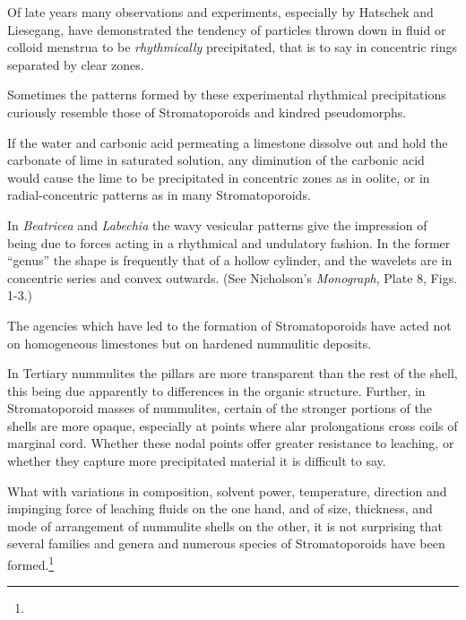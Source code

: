 \documentclass[a4paper, 12pt, oneside]{article}
\begin{document}
Of late years many observations and experiments, especially by Hatschek and Liesegang, have demonstrated the tendency of particles thrown down in fluid or colloid menstrua to be \emph{rhythmically} precipitated, that is to say in concentric rings separated by clear zones.

Sometimes the patterns formed by these experimental rhythmical precipitations curiously resemble those of Stromatoporoids and kindred pseudomorphs.

If the water and carbonic acid permeating a limestone dissolve out and hold the carbonate of lime in saturated solution, any diminution of the carbonic acid would cause the lime to be precipitated in concentric zones as in oolite, or in radial-concentric patterns as in many Stromatoporoids.

In \emph{Beatricea} and \emph{Labechia} the wavy vesicular patterns give the impression of being due to forces acting in a rhythmical and undulatory fashion. In the former ``genus'' the shape is frequently that of a hollow cylinder, and the wavelets are in concentric series and convex outwards. (See Nicholson's \emph{Monograph}, Plate 8, Figs. 1-3.)

The agencies which have led to the formation of Stromatoporoids have acted not on homogeneous limestones but on hardened nummulitic deposits.

In Tertiary nummulites the pillars are more transparent than the rest of the shell, this being due apparently to differences in the organic structure. Further, in Stromatoporoid masses of nummulites, certain of the stronger portions of the shells are more opaque, especially at points where alar prolongations cross coils of marginal cord. Whether these nodal points offer greater resistance to leaching, or whether they capture more precipitated material it is difficult to say.

What with variations in composition, solvent power, temperature, direction and impinging force of leaching fluids on the one hand, and of size, thickness, and mode of arrangement of nummulite shells on the other, it is not surprising that several families and genera and numerous species of Stromatoporoids have been formed.\footnote{}
\end{document}
